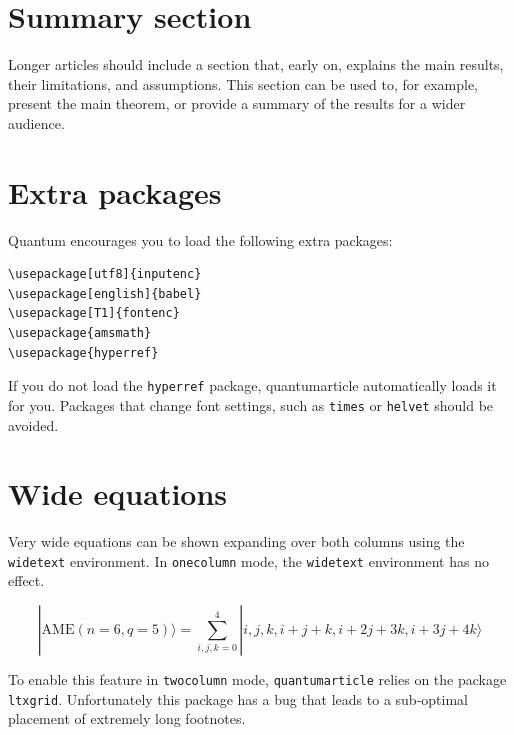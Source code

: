 \documentclass[a4paper,twocolumn,11pt,accepted=2017-05-09]{quantumarticle}
\begin{document}
\section{Summary section}
Longer articles should include a section that, early on, explains the main results, their limitations, and assumptions.
This section can be used to, for example, present the main theorem, or provide a summary of the results for a wider audience.

\section{Extra packages}
Quantum encourages you to load the following extra packages:
\begin{verbatim}
\usepackage[utf8]{inputenc}
\usepackage[english]{babel}
\usepackage[T1]{fontenc}
\usepackage{amsmath}
\usepackage{hyperref}
\end{verbatim}
If you do not load the \texttt{hyperref} package, quantumarticle automatically loads it for you.
Packages that change font settings, such as \texttt{times} or \texttt{helvet} should be avoided.

\section{Wide equations}
Very wide equations can be shown expanding over both columns using the \texttt{widetext} environment.
In \texttt{onecolumn} mode, the \texttt{widetext} environment has no effect.
\begin{widetext}
  \begin{equation}
|\mathrm{AME}(n=6,q=5)\rangle=\sum_{i,j,k=0}^4 |i,j,k,i+j+k,i+2j+3k,i+3j+4k\rangle
  \end{equation}
\end{widetext}
To enable this feature in \texttt{twocolumn} mode, \texttt{quantumarticle} relies on the package \texttt{ltxgrid}.
Unfortunately this package has a bug that leads to a sub-optimal placement of extremely long footnotes.
\end{document}
